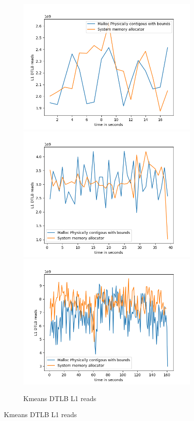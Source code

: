 \begin{figure}
  \begin{subfigure}{\linewidth}
  \includegraphics[width=.5\linewidth]{BenchmarkRuns/Kmeans/l1_tlb_kmeans_3_dimentions.png}\hfill
  \includegraphics[width=.5\linewidth]{BenchmarkRuns/Kmeans/l1_tlb_6_dimentions.png}\hfill
  \includegraphics[width=.5\linewidth]{BenchmarkRuns/Kmeans/l1_tlb_40_dimentions.png}
  \caption{Kmeans DTLB L1 reads}
\end{subfigure}
\end{figure}

